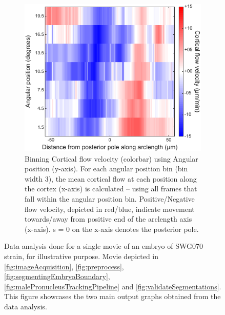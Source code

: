 \begin{figure}[h]
\begin{subfigure}[t]{0.45\textwidth}
    \label{subfig:dataAnalysisExample-postVel}
\end{subfigure}
\hfill
\begin{subfigure}[t]{0.5\textwidth}
    \centering
    \includegraphics[width=\textwidth]{ExpMethods/FigDataAnalysis/crtxFlow.pdf}
    \caption{Binning Cortical flow velocity (colorbar) using Angular position (y-axis). For each angular position bin (bin width \SI{3}{\unitAngle}), the mean cortical flow at each position along the cortex (x-axis) is calculated -- using all frames that fall within the angular position bin. Positive/Negative flow velocity, depicted in red/blue, indicate movement towards/away from positive end of the arclength axis (x-axis). s = \SI{0}{\unitLength} on the x-axis denotes the posterior pole.} 
    \label{subfig:dataAnalysisExample-crtxFlow}
\end{subfigure}
\caption[Data Analysis (example movie only)]{Data analysis done for a single movie of an embryo of SWG070 strain, for illustrative purpose. Movie depicted in \autoref{fig:imageAcquisition}, \autoref{fig:preprocess}, \autoref{fig:segmentingEmbryoBoundary}, \autoref{fig:malePronucleusTrackingPipeline} and \autoref{fig:validateSegmentations}. This figure showcases the two main output graphs obtained from the data analysis.}
\label{fig:dataAnalysisExample}
\end{figure}